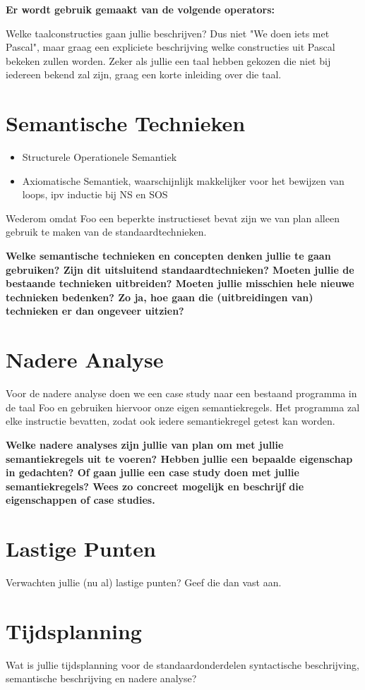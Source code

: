 \documentclass[11pt]{article}
\begin{document}
{\bf
Er wordt gebruik gemaakt van de volgende operators: 

Welke taalconstructies gaan jullie beschrijven? Dus niet "We doen iets met Pascal", maar graag een expliciete beschrijving welke constructies uit Pascal bekeken zullen worden. Zeker als jullie een taal hebben gekozen die niet bij iedereen bekend zal zijn, graag een korte inleiding over die taal.
}



\section{Semantische Technieken}

\begin{itemize}
\item Structurele Operationele Semantiek
\item Axiomatische Semantiek, waarschijnlijk makkelijker voor het bewijzen van loops, ipv inductie bij NS en SOS
\end{itemize}

Wederom omdat Foo een beperkte instructieset bevat zijn we van plan alleen gebruik te maken van de standaardtechnieken.

{\bf
Welke semantische technieken en concepten denken jullie te gaan gebruiken? Zijn dit uitsluitend standaardtechnieken? Moeten jullie de bestaande technieken uitbreiden? Moeten jullie misschien hele nieuwe technieken bedenken? Zo ja, hoe gaan die (uitbreidingen van) technieken er dan ongeveer uitzien?
}
\section{Nadere Analyse}

Voor de nadere analyse doen we een case study naar een bestaand programma in de taal Foo en gebruiken hiervoor onze eigen semantiekregels. Het programma zal elke instructie bevatten, zodat ook iedere semantiekregel getest kan worden. 


{\bf
Welke nadere analyses zijn jullie van plan om met jullie semantiekregels uit te voeren? Hebben jullie een bepaalde eigenschap in gedachten? Of gaan jullie een case study doen met jullie semantiekregels? Wees zo concreet mogelijk en beschrijf die eigenschappen of case studies.
}

\section{Lastige Punten}

Verwachten jullie (nu al) lastige punten? Geef die dan vast aan.

\section{Tijdsplanning}

Wat is jullie tijdsplanning voor de standaardonderdelen syntactische beschrijving, semantische beschrijving en nadere analyse?


%
\end{document}
